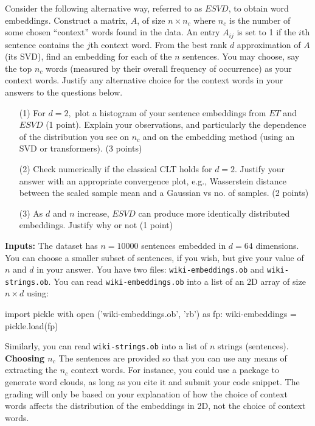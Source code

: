 \documentclass[12pt]{article}
\begin{document}
Consider the following alternative way, referred to as $ESVD$, to obtain word embeddings. Construct a matrix, $A$, of size $n \times n_c$ where 
$n_c$ is the number of some chosen ``context'' words found in the data. An entry $A_{ij}$ is set to 1 if the $i$th sentence contains the $j$th context word. 
From the best rank $d$ approximation of $A$ (its SVD), find an embedding for each of the $n$ sentences.
You may choose, say the top $n_c$ words (measured by their overall frequency of occurrence) as your context words. Justify any alternative choice for the context words 
in your answers to the questions below.
\begin{itemize}
\item[(1)] For $d = 2,$ plot a histogram of your sentence embeddings from $ET$ and $ESVD$ (1 point). Explain your observations, and particularly the dependence of the distribution 
 you see on $n_c$ and on the embedding method (using an SVD or transformers). (3 points)
\item[(2)] Check numerically if the classical CLT holds for $d=2$. Justify your answer with an appropriate convergence plot, e.g., Wasserstein distance between the scaled sample mean and a Gaussian vs no. of samples. (2 points)
\item[(3)] As $d$ and $n$ increase, $ESVD$ can produce more identically distributed embeddings. Justify why or not (1 point)  
\end{itemize}

\textbf{Inputs:} The dataset has $n=10000$ sentences embedded in $d=64$ dimensions. You can choose a smaller subset of sentences, if you wish, but give your value of $n$ and $d$ in your answer.
You have two files: \verb+wiki-embeddings.ob+ and \verb+wiki-strings.ob+. 
You can read \verb+wiki-embeddings.ob+ into a list of an 2D array of size $n\times d$ using:
\begin{verbatim*}
import pickle
with open ('wiki-embeddings.ob', 'rb') as fp:
	wiki-embeddings = pickle.load(fp)
\end{verbatim*}
Similarly, you can read \verb+wiki-strings.ob+ into a list of $n$ strings (sentences).\\

\textbf{Choosing $n_c$} The sentences are provided so that you can use any means of extracting the $n_c$ context words. For instance, you could use a package to generate word clouds, as long as you cite it and submit your code snippet.
The grading will only be based on your explanation of how the choice of context words affects the distribution of the embeddings in 2D, not the choice of context words.
\end{document}
